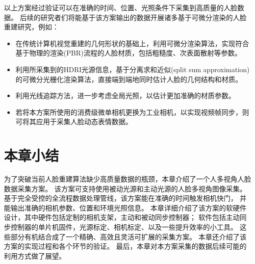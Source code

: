 以上方案经过验证可以在准确的时间、位置、光照条件下采集到高质量的人脸数据。
后续的研究者们将能基于该方案输出的数据开展诸多基于可微分渲染的人脸重建研究，例如：
\begin{itemize}
\item 在传统计算机视觉重建的几何形状的基础上，利用可微分渲染算法，实现符合基于物理的渲染(PBR)流程的人脸材质，包括粗糙度、次表面散射等参数。
\item 利用所采集到的HDRI光源信息，基于分离求和近似(split sum approximation)的可微分光栅化渲染算法，直接端到端地同时估计人脸的几何结构和材质。
\item 利用光线追踪方法，进一步考虑全局光照，以估计更加准确的材质参数。
\item 若将本方案所使用的消费级微单相机更换为工业相机，以实现视频帧同步，则可将其应用于采集人脸动态表情数据。
\end{itemize}

\section*{本章小结}

为了突破当前人脸重建算法缺少高质量数据的瓶颈，本章介绍了一个人多视角人脸数据采集方案。
该方案可支持使用被动光源和主动光源的人脸多视角图像采集。
基于完全受控的全流程数据处理管线，该方案能在准确的时间触发相机快门，
并能输出准确的相机参数、位置和环境光照信息。
本章详细介绍了该方案的软硬件设计，其中硬件包括定制的相机支架，主动和被动同步控制器；
软件包括主动同步控制器的单片机固件，光源标定、相机标定、以及一些提升效率的小工具。
这些部分有机结合成了一个精确、高效且灵活可扩展的采集方案。
本章还介绍了该方案的实现过程和各个环节的验证。
最后，本章对本方案采集的数据后续可能的利用方式做了展望。
